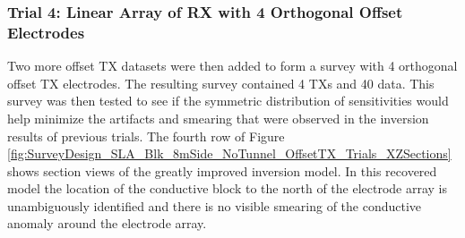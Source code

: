 \documentclass[preprint,authoryear,12pt]{elsarticle}
\providecommand{\DIFdelbegin}{} %
\providecommand{\DIFdelend}{} %
\begin{document}
\DIFdelbegin %

\DIFdelend \subsubsection{Trial 4: Linear Array of RX with 4 Orthogonal Offset Electrodes}
\label{sec:TheoreticalAnalysis_Trial4_4OrthogElecOffset}
Two more offset TX datasets were then added to form a survey with 4 orthogonal offset TX electrodes. The resulting survey contained 4 TXs and 40 data. This survey was then tested to see if the symmetric distribution of sensitivities would help minimize the artifacts and smearing that were observed in the inversion results of previous trials. The fourth row of Figure \ref{fig:SurveyDesign_SLA_Blk_8mSide_NoTunnel_OffsetTX_Trials_XZSections} shows section views of the greatly improved inversion model. In this recovered model the location of the conductive block to the north of the electrode array is unambiguously identified and there is no visible smearing of the conductive anomaly around the electrode array.


\DIFdelbegin %
\end{document}
